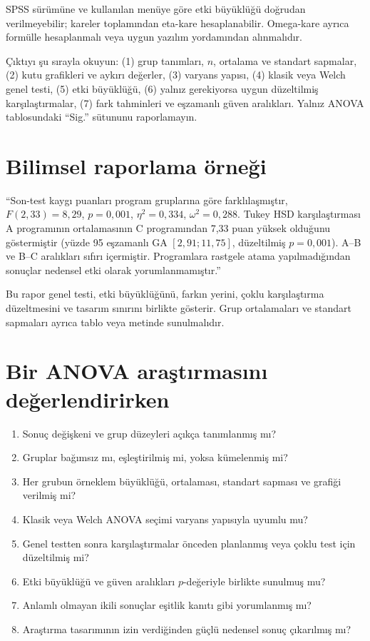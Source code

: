 SPSS sürümüne ve kullanılan menüye göre etki büyüklüğü doğrudan verilmeyebilir;
kareler toplamından eta-kare hesaplanabilir. Omega-kare ayrıca formülle
hesaplanmalı veya uygun yazılım yordamından alınmalıdır.

\begin{outputguidebox}
Çıktıyı şu sırayla okuyun: (1) grup tanımları, $n$, ortalama ve standart
sapmalar, (2) kutu grafikleri ve aykırı değerler, (3) varyans yapısı, (4)
klasik veya Welch genel testi, (5) etki büyüklüğü, (6) yalnız gerekiyorsa
uygun düzeltilmiş karşılaştırmalar, (7) fark tahminleri ve eşzamanlı güven
aralıkları. Yalnız ANOVA tablosundaki ``Sig.'' sütununu raporlamayın.
\end{outputguidebox}

\section{Bilimsel raporlama örneği}

``Son-test kaygı puanları program gruplarına göre farklılaşmıştır,
$F(2,33)=8{,}29$, $p=0{,}001$, $\eta^2=0{,}334$,
$\omega^2=0{,}288$. Tukey HSD karşılaştırması A programının ortalamasının C
programından 7,33 puan yüksek olduğunu göstermiştir (yüzde 95 eşzamanlı GA
$[2{,}91;11{,}75]$, düzeltilmiş $p=0{,}001$). A--B ve B--C aralıkları sıfırı
içermiştir. Programlara rastgele atama yapılmadığından sonuçlar nedensel etki
olarak yorumlanmamıştır.''

Bu rapor genel testi, etki büyüklüğünü, farkın yerini, çoklu karşılaştırma
düzeltmesini ve tasarım sınırını birlikte gösterir. Grup ortalamaları ve
standart sapmaları ayrıca tablo veya metinde sunulmalıdır.

\section{Bir ANOVA araştırmasını değerlendirirken}

\begin{enumerate}
  \item Sonuç değişkeni ve grup düzeyleri açıkça tanımlanmış mı?
  \item Gruplar bağımsız mı, eşleştirilmiş mi, yoksa kümelenmiş mi?
  \item Her grubun örneklem büyüklüğü, ortalaması, standart sapması ve grafiği verilmiş mi?
  \item Klasik veya Welch ANOVA seçimi varyans yapısıyla uyumlu mu?
  \item Genel testten sonra karşılaştırmalar önceden planlanmış veya çoklu test için düzeltilmiş mi?
  \item Etki büyüklüğü ve güven aralıkları $p$-değeriyle birlikte sunulmuş mu?
  \item Anlamlı olmayan ikili sonuçlar eşitlik kanıtı gibi yorumlanmış mı?
  \item Araştırma tasarımının izin verdiğinden güçlü nedensel sonuç çıkarılmış mı?
\end{enumerate}

